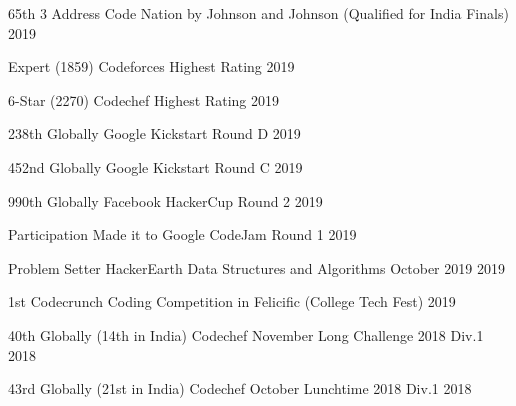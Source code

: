 \begin{cvhonors}
\cvhonor
{65th} %
{3 Address Code Nation by Johnson and Johnson (Qualified for India Finals)} %
{} %
{2019} %


\cvhonor
{Expert (1859)} %
{Codeforces Highest Rating} %
{} %
{2019} %


\cvhonor
{6-Star (2270)} %
{Codechef Highest Rating} %
{} %
{2019} %


\cvhonor
{238th Globally} %
{Google Kickstart Round D} %
{} %
{2019} %


\cvhonor
{452nd Globally} %
{Google Kickstart Round C} %
{} %
{2019} %


\cvhonor
{990th Globally} %
{Facebook HackerCup Round 2} %
{} %
{2019} %


\cvhonor
{Participation} %
{Made it to Google CodeJam Round 1} %
{} %
{2019} %


\cvhonor
{Problem Setter} %
{HackerEarth Data Structures and Algorithms October 2019} %
{} %
{2019} %


\cvhonor
{1st} %
{Codecrunch Coding Competition in Felicific (College Tech Fest)} %
{} %
{2019} %


\cvhonor
{40th Globally (14th in India)} %
{Codechef November Long Challenge 2018 Div.1} %
{} %
{2018} %


\cvhonor
{43rd Globally (21st in India)} %
{Codechef October Lunchtime 2018 Div.1} %
{} %
{2018} %


\end{cvhonors}
